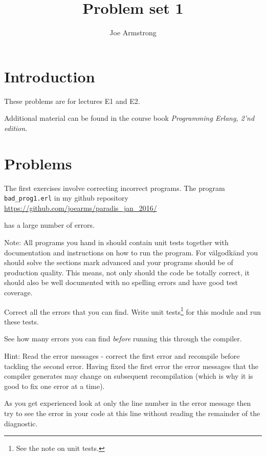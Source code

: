 \documentclass[12pt]{hitec}
\title{Problem set 1}
\author{Joe Armstrong}
\begin{document}
\maketitle

\tableofcontents

\section{Introduction}
These problems are for lectures E1 and E2.

Additional material can be found in the course book
{\sl Programming Erlang, 2'nd edition}.

\section{Problems}

The first exercises involve correcting
incorrect programs. The program \verb+bad_prog1.erl+ in my github repository
\newline
\href{https://github.com/joearms/paradis\_jan\_2016/blob/master/lectures/bad\_prog1.erl}
     {https://github.com/joearms/paradis\_jan\_2016/}

has a 
large number of errors.

Note: All programs you hand in should contain unit tests together with
documentation and instructions on how to run the program. For
v\"{a}lgodk\"{a}nd you should solve the sections mark advanced and
your programs should be of production quality. This means, not only
should the code be totally correct, it should also be well documented
with no spelling errors and have good test coverage.


Correct all the errors that you can find.  Write unit
tests\footnote{See the note on unit tests.}  for this module and run
these tests.

See how many errors you can find {\sl before} running this through the
compiler.

Hint: Read the error messages - correct the first error and recompile
before tackling the second error. Having fixed the first error the
error messages that the compiler generates may change on subsequent
recompilation (which is why it is good to fix one error at a time).

As you get experienced look at only the line number in the error
message then try to see the error in your code at this line without
reading the remainder of the diagnostic.
\end{document}
